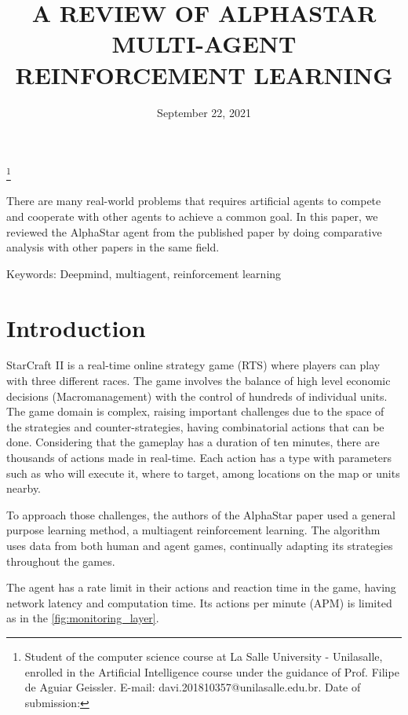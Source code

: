 \documentclass[
    article, 
    12pt,				%
	oneside,			%
	a4paper,			%
	chapter=TITLE,		%
	section=TITLE,		%
	english,			%
	english,				%
	sumario=tradicional
]{abntex2}
\date{September 22, 2021}
\title{ \textbf{\uppercase{A review of AlphaStar multi-agent reinforcement learning}}}
\makeatletter
\renewcommand{\imprimirautor}{
  \begin{flushright}
   \theauthor
   \footnote{Student of the computer science course at La Salle University - Unilasalle, enrolled in the Artificial Intelligence course under the guidance of Prof. Filipe de Aguiar Geissler. E-mail: davi.201810357@unilasalle.edu.br. Date of submission: \thedate }
  \end{flushright}
}
\makeatother
\begin{document}
 


\thetitle

\imprimirautor


\begin{resumo}
 There are many real-world problems that requires artificial agents to compete and cooperate with other agents to achieve a common goal. 
 In this paper, we reviewed the AlphaStar agent from the published paper \cite{vinyals_grandmaster_2019} by doing comparative analysis with other papers in the same field.
 
 \vspace{\onelineskip}
 Keywords: Deepmind, multiagent, reinforcement learning
\end{resumo}


\section{Introduction}

StarCraft II is a real-time online strategy game (RTS) where players can play with three different races. 
The game involves the balance of high level economic decisions (Macromanagement) with the control of hundreds of individual units. 
The game domain is complex, raising important challenges due to the space of the strategies and counter-strategies, having combinatorial actions that can be done. 
Considering that the gameplay has a duration of ten minutes, there are thousands of actions made in real-time.
Each action has a type with parameters such as who will execute it, where to target, among locations on the map or units nearby.

To approach those challenges, the authors of the AlphaStar paper \cite{vinyals_grandmaster_2019} used a general purpose learning method, a multiagent reinforcement learning. 
The algorithm uses data from both human and agent games, continually adapting its strategies throughout the games.

The agent has a rate limit in their actions and reaction time in the game, having network latency and computation time. 
Its actions per minute (APM) is limited as in the \autoref{fig:monitoring_layer}.  
\end{document}
